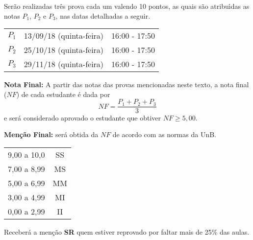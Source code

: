 \documentclass[12pt]{article}
\begin{document}
 Ser\~ao realizadas tr\^es prova cada um valendo 10 pontos, as quais s\~ao atribu{\'\i}das as notas $P_1$, $P_2$ e $P_3$, nas datas detalhadas a seguir.

\begin{center}
    \begin{tabular}{|c|c|c|}
        \hline\hline
        \hspace{1cm}{\bf Prova}\hspace{1cm} & \hspace{3cm}{\bf Data}\hspace{3cm} & \hspace{1.7cm}{\bf Hor\'ario}\hspace{1.7cm} \\
        \hline\hline
        $P_1$ & 13/09/18 (quinta-feira) \phantom{x} & 16:00 - 17:50 \\
        \hline
        $P_2$ & 25/10/18 (quinta-feira) \phantom{x} & 16:00 - 17:50 \\
        \hline
        $P_3$ & 29/11/18 (quinta-feira) \phantom{x} & 16:00 - 17:50 \\
        \hline\hline
    \end{tabular}
\end{center}

{\bf \noindent Nota Final:} A partir das notas das provas mencionadas neste texto, a nota final ($NF$) de cada estudante \'e dada
por
\vspace{-0.15cm}
\[
NF = \frac{ P_1 + P_2 + P_3}{3} 
\]
e ser\'a considerado aprovado o estudante que obtiver $NF \geq 5,00$.

{\bf \noindent Men\c{c}\~ao Final:} ser\'a obtida da $NF$ de
acordo com as normas da UnB.
\begin{center}
    \begin{tabular}{c|c}
        \hline\hline
        \hspace{1cm}{Nota}\hspace{1cm} & \hspace{0.25cm}{Men\c{c}\~ao}\hspace{0.25cm}\\
        \hline\hline
        9,00 a 10,0 & SS \\
        \hline
        7,00 a 8,99 & MS \\
        \hline
        5,00 a 6,99 & MM \\
        \hline
        3,00 a 4,99 & MI \\
        \hline
        0,00 a 2,99  & II \\
        \hline\hline
    \end{tabular}
\end{center}
Receber\'a a men{\c c}\~ao {\bf SR} quem estiver reprovado por faltar mais de 25\%
das aulas.
\end{document}
